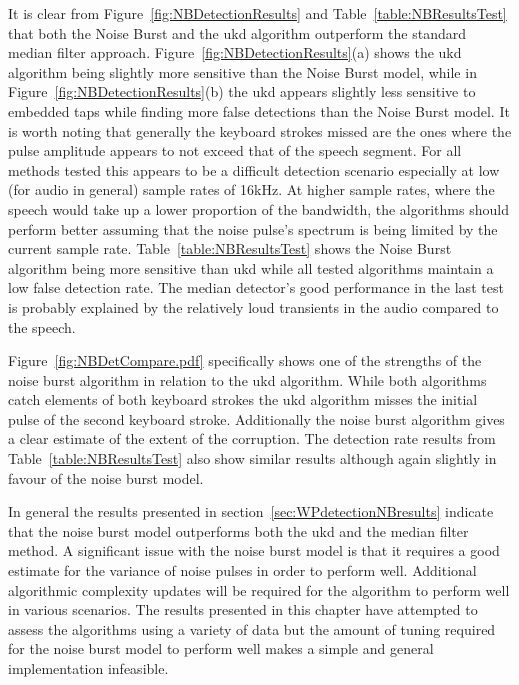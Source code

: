 It is clear from Figure~\ref{fig:NBDetectionResults} and Table~\ref{table:NBResultsTest} that both the Noise Burst and the \gls{ukd} algorithm outperform the standard median filter approach. Figure~\ref{fig:NBDetectionResults}(a) shows the \gls{ukd} algorithm being slightly more sensitive than the Noise Burst model, while in Figure~\ref{fig:NBDetectionResults}(b) the \gls{ukd} appears slightly less sensitive to embedded taps while finding more false detections than the Noise Burst model. It is worth noting that generally the keyboard strokes missed are the ones where the pulse amplitude appears to not exceed that of the speech segment. For all methods tested this appears to be a difficult detection scenario especially at low (for audio in general) sample rates of 16kHz. At higher sample rates, where the speech would take up a lower proportion of the bandwidth, the algorithms should perform better assuming that the noise pulse's spectrum is being limited by the current sample rate. Table~\ref{table:NBResultsTest} shows the Noise Burst algorithm being more sensitive than \gls{ukd} while all tested algorithms maintain a low false detection rate. The median detector's good performance in the last test is probably explained by the relatively loud transients in the audio compared to the speech.

Figure~\ref{fig:NBDetCompare.pdf} specifically shows one of the strengths of the noise burst algorithm in relation to the \gls{ukd} algorithm. While both algorithms catch elements of both keyboard strokes the \gls{ukd} algorithm misses the initial pulse of the second keyboard stroke. Additionally the noise burst algorithm gives a clear estimate of the extent of the corruption. The detection rate results from Table~\ref{table:NBResultsTest} also show similar results although again slightly in favour of the noise burst model.

In general the results presented in section~\ref{sec:WPdetectionNBresults} indicate that the noise burst model outperforms both the \gls{ukd} and the median filter method. A significant issue with the noise burst model is that it requires a good estimate for the variance of noise pulses in order to perform well. Additional algorithmic complexity updates will be required for the algorithm to perform well in various scenarios. The results presented in this chapter have attempted to assess the algorithms using a variety of data but the amount of tuning required for the noise burst model to perform well makes a simple and general implementation infeasible.

